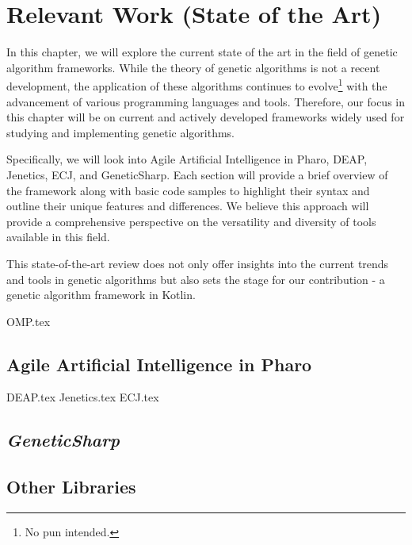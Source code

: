\chapter{Relevant Work (State of the Art)}
\label{chap:sota}

  In this chapter, we will explore the current state of the art in the field of
  genetic algorithm frameworks.
  While the theory of genetic algorithms is not a recent development, the
  application of these algorithms continues to evolve\footnote{No pun intended.}
  with the advancement of various programming languages and tools.
  Therefore, our focus in this chapter will be on current and actively developed
  frameworks widely used for studying and implementing genetic algorithms.

  Specifically, we will look into Agile Artificial Intelligence in Pharo, DEAP,
  Jenetics, ECJ, and GeneticSharp.
  Each section will provide a brief overview of the framework along with basic
  code samples to highlight their syntax and outline their unique features and
  differences.
  We believe this approach will provide a comprehensive perspective on the
  versatility and diversity of tools available in this field.

  This state-of-the-art review does not only offer insights into the current
  trends and tools in genetic algorithms but also sets the stage for our
  contribution - a genetic algorithm framework in Kotlin.

  {OMP.tex}
  
  \section{Agile Artificial Intelligence in Pharo}
  \label{sec:sota:pharo}
    \Blindtext

  {DEAP.tex}
  {Jenetics.tex}
  {ECJ.tex}
  \section{\textit{GeneticSharp}}
  \label{sec:sota:geneticsharp}
    \Blindtext
  \section{Other Libraries}
  \label{sec:sota:other}
    \Blindtext
